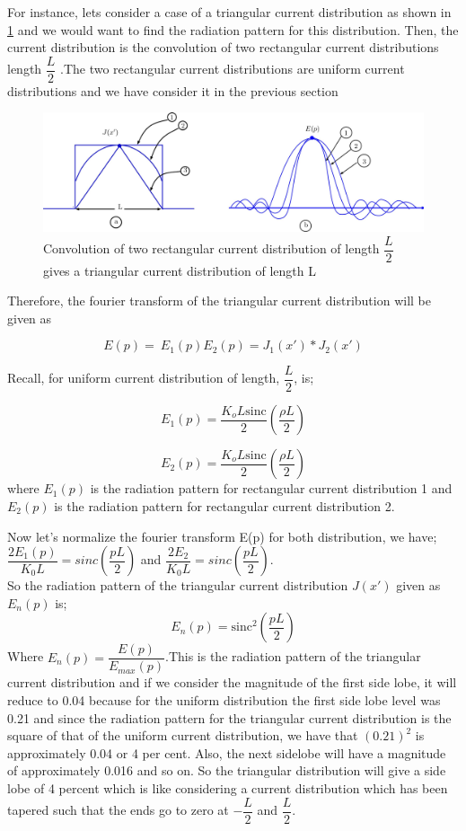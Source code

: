 For instance, lets consider a case of a triangular current distribution as shown in \ref{fig:n13} and we would want to find the radiation pattern for this distribution. Then, the current distribution is the convolution of two rectangular current distributions length $\dfrac{L}{2}$ .The two rectangular current distributions are uniform current distributions and we have consider it in the previous section
\begin{figure}[h]
\centering
\includegraphics[width=1\linewidth]{./graphics/n12}
\caption{Convolution of two rectangular current distribution of length $\dfrac{L}{2}$ gives a triangular current distribution of length L}
\label{fig:n13}
\end{figure}

Therefore, the fourier transform of the triangular current distribution will be given as

\begin{equation*}
E(p) =  \ E_1(p) E_{2}(p) = J_{1}(x') * J_{2}(x')
\end{equation*}

Recall, for uniform current distribution of length, $\dfrac{L}{2}$, is;

$$
E_{1}(p) = \dfrac{K_{o}L\text{sinc}}{2} \left(\dfrac{\rho L}{2}\right)$$

$$
E_{2}(p) = \dfrac{K_{o}L\text{sinc}}{2} \left(\dfrac{\rho L}{2}\right)$$
where $E_{1}(p)$ is the radiation pattern for rectangular current distribution 1
and $E_2(p)$ is the radiation pattern for rectangular current distribution 2.

Now let's normalize the fourier transform E(p) for both distribution, we have;\\
$\dfrac{2E_1(p)}{K_0L} = sinc(\dfrac{pL}{2})$ and $\dfrac{2E_2}{K_0L} = sinc(\dfrac{pL}{2})$.\\
So the radiation pattern of the triangular current distribution $J(x')$ given as $E_n(p)$ is;
\begin{equation}
E_n(p) = \text{sinc}^2\left(\dfrac{pL}{2}\right)
\end{equation}  
Where $E_n(p) = \dfrac{E(p)}{E_{max}(p)}$.This is the radiation pattern of the triangular current distribution and if we consider the magnitude of the first side lobe, it will reduce to 0.04 because for the uniform distribution the first side lobe level was 0.21 and since the radiation pattern for the triangular current distribution is the square of that of the uniform current distribution, we have that $(0.21)^2$ is approximately 0.04 or 4 per cent. Also, the next sidelobe will have a magnitude of approximately 0.016 and so on. So the triangular distribution will give a side lobe of 4 percent which is like considering a current distribution which has been tapered such that the ends go to zero at $-\dfrac{L}{2}$ and $\dfrac{L}{2}$.

